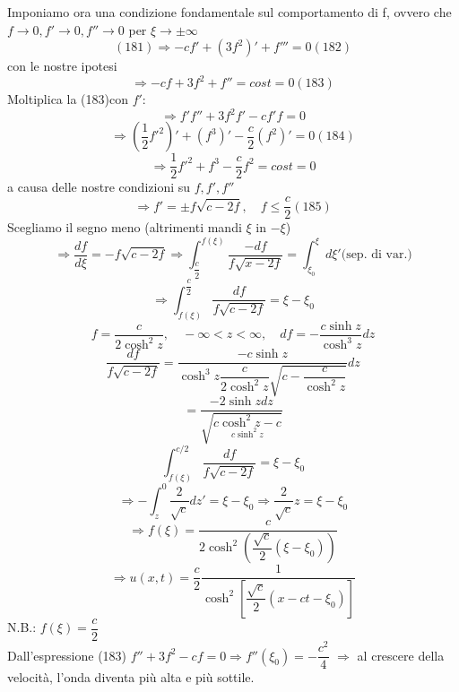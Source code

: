 \documentclass[a4paper,11pt]{report}
\begin{document}
Imponiamo ora una condizione fondamentale sul comportamento di f, ovvero che $f\to 0, f'\to 0, f''\to 0$ per $\xi \to \pm \infty$
\begin{equation}
(181)\Rightarrow -cf' + (3f^2)' + f'''=0(182)
\end{equation}
con le nostre ipotesi
\begin{equation}
\Rightarrow -cf + 3f^2 + f''=cost=0 (183)
\end{equation}
Moltiplica la (183)con $f'$:
$$
\Rightarrow f'f'' + 3f^2f'-cf'f=0 
$$
\begin{equation}
\Rightarrow \left(\dfrac{1}{2}f'^2\right)' + (f^3)' - \dfrac{c}{2}(f^2)'=0 (184)
\end{equation}
$$
\Rightarrow \dfrac{1}{2}f'^2+f^3-\dfrac{c}{2}f^2 = cost=0
$$
a causa delle nostre condizioni su $f,f',f''$
\begin{equation}
\Rightarrow f'=\pm f\sqrt{c-2f}, \quad f\le \dfrac{c}{2} (185)
\end{equation}
Scegliamo il segno meno (altrimenti mandi $\xi$ in $-\xi$)
$$
\Rightarrow \dfrac{df}{d\xi}=-f\sqrt{c-2f}\Rightarrow\int_{\dfrac{c}{2}}^{f(\xi)}\dfrac{-df}{f\sqrt{x-2f}}=\int_{\xi_0}^{\xi}d\xi' \text{(sep. di var.)}
$$
$$
\Rightarrow\int_{f(\xi)}^{\dfrac{c}{2}}\dfrac{df}{f\sqrt{c-2f}}=\xi - \xi_0
$$
$$
f=\dfrac{c}{2\cosh^2 z},\quad -\infty<z<\infty, \quad df=-\dfrac{c\sinh z}{\cosh^3 z}dz
$$
$$
\dfrac{df}{f\sqrt{c-2f}}=\dfrac{-c \sinh z}{\cosh^3 z\dfrac{c}{2\cosh^2z}\sqrt{c-\dfrac{c}{\cosh^2 z}}}dz
$$
$$
=\dfrac{-2\sinh z dz}{\sqrt{\underset{c\sinh^2 z}{c\cosh^2z - c}}}
$$
$$
\int_{f(\xi)}^{c/2}\dfrac{df}{f\sqrt{c-2f}}=\xi - \xi_0
$$
$$
\Rightarrow - \int_z^0 \dfrac{2}{\sqrt{c}}dz'=\xi - \xi_0 \Rightarrow\dfrac{2}{\sqrt{c}}z=\xi - \xi_0
$$
$$
\Rightarrow f(\xi)=\dfrac{c}{2\cosh^2 \left(\dfrac{\sqrt{c}}{2}(\xi-\xi_0)\right)}
$$
$$
\Rightarrow u(x,t)=\dfrac{c}{2}\dfrac{1}{\cosh^2 \left[\dfrac{\sqrt{c}}{2}(x-ct-\xi_0)\right]}
$$
N.B.: $f(\xi)=\dfrac{c}{2}$\\
Dall'espressione (183) $f'' + 3f^2 - cf=0 \Rightarrow f''(\xi_0)=-\dfrac{c^2}{4}$
$\Rightarrow$ al crescere della velocità, l'onda diventa più alta e più sottile.
\end{document}
